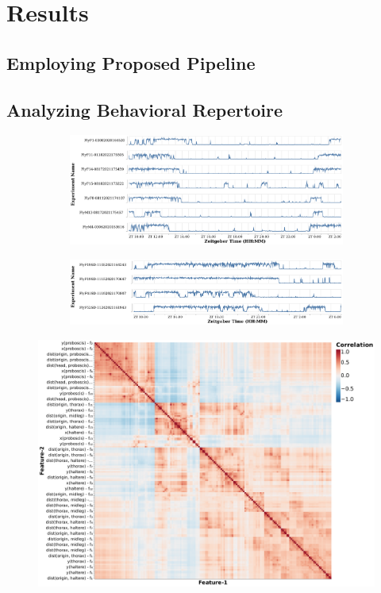\chapter{Results}

\section{Employing Proposed Pipeline}\label{section:employing-proposed-pipeline}

\section{Analyzing Behavioral Repertoire}\label{section:analyzing-behavioral-repertoire}

\begin{figure}[ht!]
	\centering
	\begin{subfigure}[ht!]{0.85\linewidth}
		\centering\includegraphics[width=\linewidth]{figures/Velocity-WT-1T.pdf}
		\caption{}
	\end{subfigure}%

	\begin{subfigure}[ht!]{0.85\linewidth}
		\centering\includegraphics[width=\linewidth]{figures/Velocity-SD-1T.pdf}
		\caption{}
	\end{subfigure}%
\end{figure}

\begin{figure}[ht!]
	\centering
	\includegraphics[width=0.70\linewidth]{figures/FeatureCorrelations-FlyF1DAnn.pdf}
	\caption{\label{figure:correlations-btw-features}}
\end{figure}

